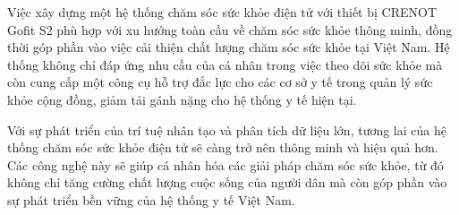 Việc xây dựng một hệ thống chăm sóc sức khỏe điện tử với thiết bị CRENOT Gofit S2 phù hợp với xu hướng toàn cầu về chăm sóc sức khỏe thông minh, đồng thời góp phần vào việc cải thiện chất lượng chăm sóc sức khỏe tại Việt Nam. Hệ thống không chỉ đáp ứng nhu cầu của cá nhân trong việc theo dõi sức khỏe mà còn cung cấp một công cụ hỗ trợ đắc lực cho các cơ sở y tế trong quản lý sức khỏe cộng đồng, giảm tải gánh nặng cho hệ thống y tế hiện tại.

Với sự phát triển của trí tuệ nhân tạo và phân tích dữ liệu lớn, tương lai của hệ thống chăm sóc sức khỏe điện tử sẽ càng trở nên thông minh và hiệu quả hơn. Các công nghệ này sẽ giúp cá nhân hóa các giải pháp chăm sóc sức khỏe, từ đó không chỉ tăng cường chất lượng cuộc sống của người dân mà còn góp phần vào sự phát triển bền vững của hệ thống y tế Việt Nam.